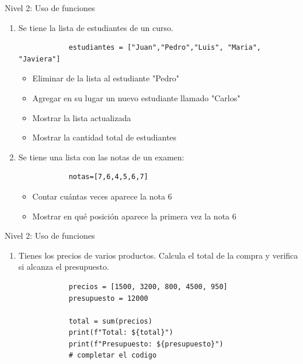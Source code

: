 \documentclass{beamer}
\begin{document}
    \begin{frame}[fragile, t]{Nivel 2: Uso de funciones}
        \begin{enumerate}
            \item[8.] Se tiene la lista de estudiantes de un curso.
            \begin{verbatim}
            estudiantes = ["Juan","Pedro","Luis", "Maria", "Javiera"]
            \end{verbatim}
            \begin{itemize}
                \item Eliminar de la lista al estudiante "Pedro"
                \item Agregar en su lugar un nuevo estudiante llamado "Carlos"
                \item Mostrar la lista actualizada
                \item Mostrar la cantidad total de estudiantes
            \end{itemize}
            \item[9.] Se tiene una lista con las notas de un examen:
            \begin{verbatim}
            notas=[7,6,4,5,6,7]
            \end{verbatim}
            \begin{itemize}
                \item Contar cuántas veces aparece la nota 6
                \item Mostrar en qué posición aparece la primera vez la nota 6
            \end{itemize}
        \end{enumerate}
    \end{frame}

    \begin{frame}[fragile, t]{Nivel 2: Uso de funciones}
        \begin{enumerate}
            \item[10.] Tienes los precios de varios productos. Calcula el total de la compra y verifica si alcanza el presupuesto.
            \begin{verbatim}
            precios = [1500, 3200, 800, 4500, 950]
            presupuesto = 12000
            
            total = sum(precios)
            print(f"Total: ${total}")
            print(f"Presupuesto: ${presupuesto}")
            # completar el codigo
            \end{verbatim}
        \end{enumerate}
    \end{frame}
\end{document}
